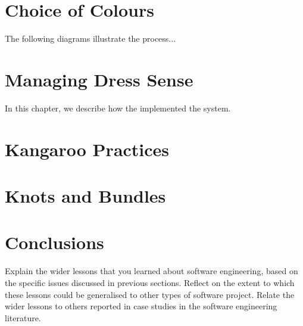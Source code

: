 \documentclass{l3proj}
\begin{document}

\begin{comment}
 I have some areas that we could consider:

  - team dynamics throughout the project
  - estimations of customer goals/customer management
  - improvements made over time
  - contributions

\end{comment}




\section{Choice of Colours}
\label{design}

The following diagrams illustrate the
process...

\section{Managing Dress Sense}
\label{managing}

In this chapter, we describe how the implemented the system.

\section{Kangaroo Practices}



\section{Knots and Bundles}
\label{sec:managing}


\section{Conclusions}

Explain the wider lessons that you learned about software engineering,
based on the specific issues discussed in previous sections.  Reflect
on the extent to which these lessons could be generalised to other
types of software project.  Relate the wider lessons to others
reported in case studies in the software engineering literature.



\end{document}
